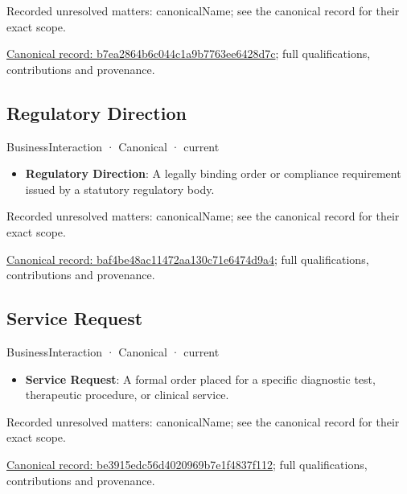 {\small Recorded unresolved matters: canonicalName; see the canonical record for their exact scope.}\par
{\footnotesize \href{../../../../continuum/business/business-interaction/b7ea2864b6c044c1a9b7763ee6428d7c.md}{Canonical record: b7ea2864b6c044c1a9b7763ee6428d7c}; full qualifications, contributions and provenance.}\par
\subsection{Regulatory Direction}

\label{element:baf4be48ac11472aa130c71e6474d9a4}
{\small BusinessInteraction · Canonical · current}\par

\begin{itemize}


\item \textbf{Regulatory Direction}: A legally binding order or compliance requirement issued by a statutory regulatory body.

\end{itemize}

{\small Recorded unresolved matters: canonicalName; see the canonical record for their exact scope.}\par
{\footnotesize \href{../../../../continuum/business/business-interaction/baf4be48ac11472aa130c71e6474d9a4.md}{Canonical record: baf4be48ac11472aa130c71e6474d9a4}; full qualifications, contributions and provenance.}\par
\subsection{Service Request}

\label{element:be3915edc56d4020969b7e1f4837f112}
{\small BusinessInteraction · Canonical · current}\par

\begin{itemize}


\item \textbf{Service Request}: A formal order placed for a specific diagnostic test, therapeutic procedure, or clinical service.

\end{itemize}

{\small Recorded unresolved matters: canonicalName; see the canonical record for their exact scope.}\par
{\footnotesize \href{../../../../continuum/business/business-interaction/be3915edc56d4020969b7e1f4837f112.md}{Canonical record: be3915edc56d4020969b7e1f4837f112}; full qualifications, contributions and provenance.}\par
